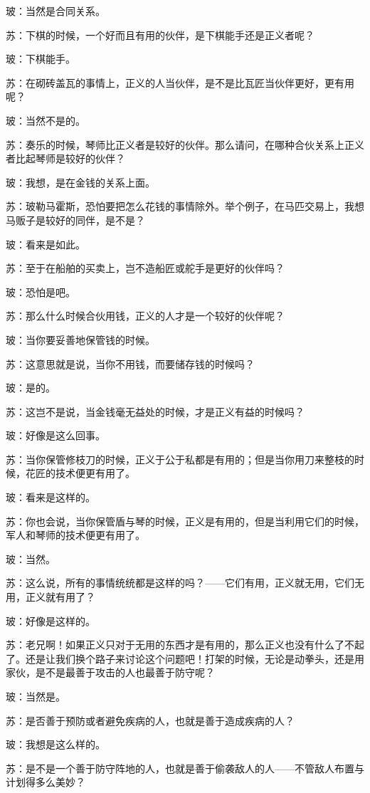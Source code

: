 \documentclass[11pt,oneside]{book}
\begin{document}
\begin{common-format}
玻：当然是合同关系。

苏：下棋的时候，一个好而且有用的伙伴，是下棋能手还是正义者呢？

玻：下棋能手。

苏：在砌砖盖瓦的事情上，正义的人当伙伴，是不是比瓦匠当伙伴更好，更有用呢？

玻：当然不是的。

苏：奏乐的时候，琴师比正义者是较好的伙伴。那么请问，在哪种合伙关系上正义者比起琴师是较好的伙伴？

玻：我想，是在金钱的关系上面。

苏：玻勒马霍斯，恐怕要把怎么花钱的事情除外。举个例子，在马匹交易上，我想马贩子是较好的同伴，是不是？

玻：看来是如此。

苏：至于在船舶的买卖上，岂不造船匠或舵手是更好的伙伴吗？

玻：恐怕是吧。

苏：那么什么时候合伙用钱，正义的人才是一个较好的伙伴呢？

玻：当你要妥善地保管钱的时候。

苏：这意思就是说，当你不用钱，而要储存钱的时候吗？

玻：是的。

苏：这岂不是说，当金钱毫无益处的时候，才是正义有益的时候吗？

玻：好像是这么回事。

苏：当你保管修枝刀的时候，正义于公于私都是有用的；但是当你用刀来整枝的时候，花匠的技术便更有用了。

玻：看来是这样的。

苏：你也会说，当你保管盾与琴的时候，正义是有用的，但是当利用它们的时候，军人和琴师的技术便更有用了。

玻：当然。

苏：这么说，所有的事情统统都是这样的吗？——它们有用，正义就无用，它们无用，正义就有用了？

玻：好像是这样的。

苏：老兄啊！如果正义只对于无用的东西才是有用的，那么正义也没有什么了不起了。还是让我们换个路子来讨论这个问题吧！打架的时候，无论是动拳头，还是用家伙，是不是最善于攻击的人也最善于防守呢？

玻：当然是。

苏：是否善于预防或者避免疾病的人，也就是善于造成疾病的人？

玻：我想是这么样的。

苏：是不是一个善于防守阵地的人，也就是善于偷袭敌人的人——不管敌人布置与计划得多么美妙？


\end{common-format}
\end{document}
